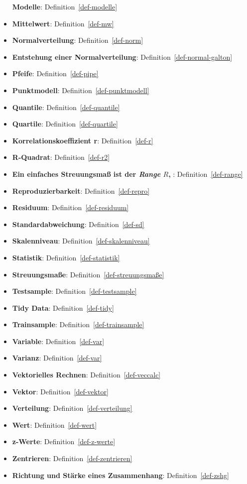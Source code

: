 \documentclass[
  letterpaper,
]{scrbook}
\theoremstyle{definition}
\theoremstyle{definition}
\theoremstyle{definition}
\theoremstyle{remark}
\begin{document}
\begin{itemize}
  \textbf{Modelle}: Definition~\ref{def-modelle}
\item
  \textbf{Mittelwert}: Definition~\ref{def-mw}
\item
  \textbf{Normalverteilung}: Definition~\ref{def-norm}
\item
  \textbf{Entstehung einer Normalverteilung}:
  Definition~\ref{def-normal-galton}
\item
  \textbf{Pfeife}: Definition~\ref{def-pipe}
\item
  \textbf{Punktmodell}: Definition~\ref{def-punktmodell}
\item
  \textbf{Quantile}: Definition~\ref{def-quantile}
\item
  \textbf{Quartile}: Definition~\ref{def-quartile}
\item
  \textbf{Korrelationskoeffizient r}: Definition~\ref{def-r}
\item
  \textbf{R-Quadrat}: Definition~\ref{def-r2}
\item
  \textbf{Ein einfaches Streuungsmaß ist der \emph{Range} \(R\), }:
  Definition~\ref{def-range}
\item
  \textbf{Reproduzierbarkeit}: Definition~\ref{def-repro}
\item
  \textbf{Residuum}: Definition~\ref{def-residuum}
\item
  \textbf{Standardabweichung}: Definition~\ref{def-sd}
\item
  \textbf{Skalenniveau}: Definition~\ref{def-skalenniveau}
\item
  \textbf{Statistik}: Definition~\ref{def-statistik}
\item
  \textbf{Streuungsmaße}: Definition~\ref{def-streuungsmaße}
\item
  \textbf{Testsample}: Definition~\ref{def-testsample}
\item
  \textbf{Tidy Data}: Definition~\ref{def-tidy}
\item
  \textbf{Trainsample}: Definition~\ref{def-trainsample}
\item
  \textbf{Variable}: Definition~\ref{def-var}
\item
  \textbf{Varianz}: Definition~\ref{def-var}
\item
  \textbf{Vektorielles Rechnen}: Definition~\ref{def-veccalc}
\item
  \textbf{Vektor}: Definition~\ref{def-vektor}
\item
  \textbf{Verteilung}: Definition~\ref{def-verteilung}
\item
  \textbf{Wert}: Definition~\ref{def-wert}
\item
  \textbf{z-Werte}: Definition~\ref{def-z-werte}
\item
  \textbf{Zentrieren}: Definition~\ref{def-zentrieren}
\item
  \textbf{Richtung und Stärke eines Zusammenhang}:
  Definition~\ref{def-zshg}
\end{itemize}


\backmatter
\end{document}
